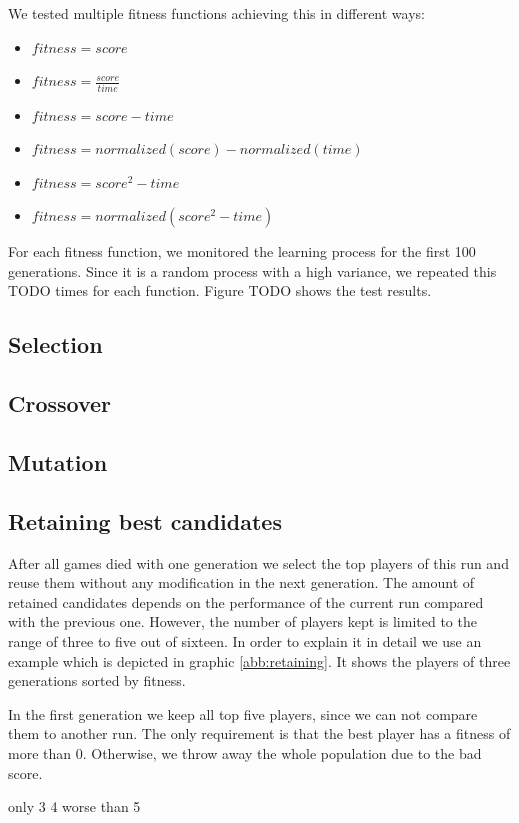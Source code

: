 \documentclass[a4paper,12pt,pagesize,headsepline,bibtotoc,titlepage,abstracton]{scrartcl}
\begin{document}
We tested multiple fitness functions achieving this in different ways:
\begin{itemize}
\item $fitness = score$
\item $fitness = \frac{score}{time}$
\item $fitness = score - time$
\item $fitness = normalized(score) - normalized(time)$
\item $fitness = score^2 - time$
\item $fitness = normalized(score^2 - time)$
\end{itemize}

For each fitness function, we monitored the learning process for the first 100 generations. Since it is a random process with a high variance, we repeated this TODO times for each function. Figure TODO shows the test results.


\subsection{Selection}
\subsection{Crossover}
\subsection{Mutation}
\subsection{Retaining best candidates}

After all games died with one generation we select the top players of this run and reuse them without any modification in the next generation. The amount of retained candidates depends on the performance of the current run compared with the previous one. However, the number of players kept is limited to the range of three to five out of sixteen. In order to explain it in detail we use an example which is depicted in graphic \ref{abb:retaining}. It shows the players of three generations sorted by fitness.

In the first generation we keep all top five players, since we can not compare them to another run. The only requirement is that the best player has a fitness of more than 0. Otherwise, we throw away the whole population due to the bad score.

only 3
4 worse than 5
\end{document}
